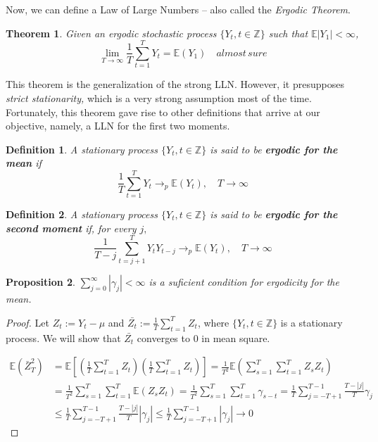 \documentclass[11pt, a4paper]{report}
\theoremstyle{plain}
\newtheorem{thm}{Theorem}[section]
\newtheorem{prop}[thm]{Proposition}
\theoremstyle{plain}
\newtheorem{defn}{Definition}[section]
\theoremstyle{remark}
\begin{document}
Now, we can define a Law of Large Numbers -- also called the \textit{Ergodic Theorem}.

\begin{thm}
	Given an ergodic stochastic process $\{Y_t, t \in \mathbb{Z} \}$ such that $\mathbb{E}|Y_1| < \infty$,
	$$\lim_{T \rightarrow \infty} \dfrac{1}{T} \sum_{t=1}^T Y_t = \mathbb{E}(Y_1) \hspace{1em} almost \, sure$$
\end{thm}

This theorem is the generalization of the strong LLN. However, it presupposes \textit{strict stationarity,} which is a very strong assumption most of the time. Fortunately, this theorem gave rise to other definitions that arrive at our objective, namely, a LLN for the first two moments.

\begin{defn}
	A stationary process $\{Y_t, t \in \mathbb{Z} \}$ is said to be \textbf{ergodic for the mean} if
	$$ \dfrac{1}{T} \sum_{t=1}^T Y_t \to_p \mathbb{E}(Y_t), \hspace{1em} T \to \infty $$
\end{defn}

\begin{defn}
	A stationary process $\{Y_t, t \in \mathbb{Z} \}$ is said to be \textbf{ergodic for the second moment} if, for every $j,$
	$$ \dfrac{1}{T-j} \sum_{t=j+1}^T Y_t Y_{t-j} \to_p \mathbb{E}(Y_t), \hspace{1em} T \to \infty $$
\end{defn}

\begin{prop}
	$\sum_{j=0}^{\infty} |\gamma_j| < \infty $ is a suficient condition for ergodicity for the mean.
\end{prop}

\begin{proof}
	Let $Z_t := Y_t - \mu$ and $\bar{Z_t} := \frac{1}{T} \sum_{t=1}^T Z_t$, where $\{Y_t, t \in \mathbb{Z} \}$ is a stationary process. We will show that $\bar{Z_t}$ converges to 0 in mean square.
	
	\begin{math}
		\begin{aligned}
			\mathbb{E}\left(\bar{Z}_{T}^{2}\right) &=\mathbb{E}\left[\left(\frac{1}{T} \sum_{t=1}^{T} Z_{t}\right)\left(\frac{1}{T} \sum_{t=1}^{T} Z_{t}\right)\right]=\frac{1}{T^{2}} \mathbb{E}\left(\sum_{s=1}^{T} \sum_{t=1}^{T} Z_{s} Z_{t}\right) \\
			&=\frac{1}{T^{2}} \sum_{s=1}^{T} \sum_{t=1}^{T} \mathbb{E}\left(Z_{s} Z_{t}\right)=\frac{1}{T^{2}} \sum_{s=1}^{T} \sum_{t=1}^{T} \gamma_{s-t}=\frac{1}{T} \sum_{j=-T+1}^{T-1} \frac{T-|j|}{T} \gamma_{j} \\
			& \leq \frac{1}{T} \sum_{j=-T+1}^{T-1} \frac{T-|j|}{T}\left|\gamma_{j}\right| \leq \frac{1}{T} \sum_{j=-T+1}^{T-1}\left|\gamma_{j}\right| \rightarrow 0
		\end{aligned}
	\end{math} 

\end{proof}
\end{document}
